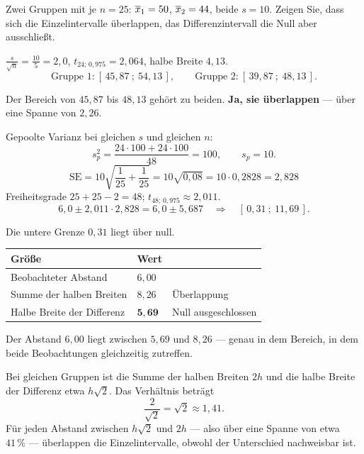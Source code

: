 \begin{aufgabe}
Zwei Gruppen mit je $n=25$: $\overline{x}_1 = 50$, $\overline{x}_2 = 44$, beide $s = 10$. Zeigen Sie, dass sich die Einzelintervalle überlappen, das Differenzintervall die Null aber ausschließt.

\loesung
{}
$\frac{s}{\sqrt n} = \frac{10}{5} = 2{,}0$, $t_{24;\,0{,}975} = 2{,}064$, halbe Breite $4{,}13$.
\[ \text{Gruppe 1:}\ [\,45{,}87\ ;\ 54{,}13\,], \qquad \text{Gruppe 2:}\ [\,39{,}87\ ;\ 48{,}13\,] . \]

Der Bereich von $45{,}87$ bis $48{,}13$ gehört zu beiden. \textbf{Ja, sie überlappen} --- über eine Spanne von $2{,}26$.

Gepoolte Varianz bei gleichen $s$ und gleichen $n$:
\[ s_p^2 = \frac{24 \cdot 100 + 24 \cdot 100}{48} = 100, \qquad s_p = 10 . \]
\[ \mathrm{SE} = 10\sqrt{\frac{1}{25}+\frac{1}{25}} = 10\sqrt{0{,}08} = 10 \cdot 0{,}2828 = 2{,}828 \]
Freiheitsgrade $25+25-2 = 48$; $t_{48;\,0{,}975} \approx 2{,}011$.
\[ 6{,}0 \pm 2{,}011 \cdot 2{,}828 = 6{,}0 \pm 5{,}687 \quad\Longrightarrow\quad [\,0{,}31\ ;\ 11{,}69\,] . \]

Die untere Grenze $0{,}31$ liegt über null. \checkmark

\begin{center}
\renewcommand{\arraystretch}{1.48}
\begin{tabular}{@{}P{3.6cm}P{2.2cm}P{2.4cm}@{}}
\toprule
\textbf{Größe} & \textbf{Wert} & \\
\midrule
Beobachteter Abstand & $6{,}00$ & \\
Summe der halben Breiten & $8{,}26$ & \textcolor{akzent}{Überlappung}\\
Halbe Breite der Differenz & $\mathbf{5{,}69}$ & \textcolor{gruen}{Null ausgeschlossen}\\
\bottomrule
\end{tabular}
\end{center}

Der Abstand $6{,}00$ liegt zwischen $5{,}69$ und $8{,}26$ --- genau in dem Bereich, in dem beide Beobachtungen gleichzeitig zutreffen.

Bei gleichen Gruppen ist die Summe der halben Breiten $2h$ und die halbe Breite der Differenz etwa $h\sqrt 2$. Das Verhältnis beträgt
\[ \frac{2}{\sqrt2} = \sqrt2 \approx 1{,}41 . \]
Für jeden Abstand zwischen $h\sqrt2$ und $2h$ --- also über eine Spanne von etwa $41\,\%$ --- überlappen die Einzelintervalle, obwohl der Unterschied nachweisbar ist.


\end{aufgabe}
